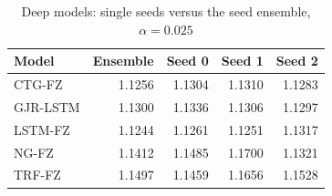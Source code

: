 \begin{table}[htbp]
\centering
\footnotesize
\caption{Deep models: single seeds versus the seed ensemble, $\alpha=0.025$}
\label{tab:seeds}
\begin{tabular}{lrrrr}
\toprule
Model & Ensemble & Seed 0 & Seed 1 & Seed 2 \\
\midrule
CTG-FZ & 1.1256 & 1.1304 & 1.1310 & 1.1283 \\
GJR-LSTM & 1.1300 & 1.1336 & 1.1306 & 1.1297 \\
LSTM-FZ & 1.1244 & 1.1261 & 1.1251 & 1.1317 \\
NG-FZ & 1.1412 & 1.1485 & 1.1700 & 1.1321 \\
TRF-FZ & 1.1497 & 1.1459 & 1.1656 & 1.1528 \\
\bottomrule
\end{tabular}
\end{table}